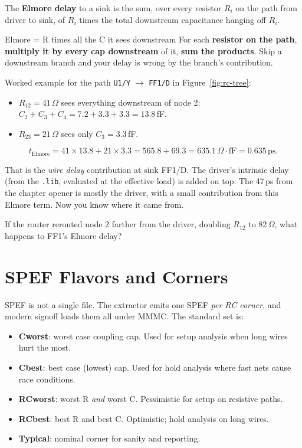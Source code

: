 The \textbf{Elmore delay} to a sink is the sum, over every resistor $R_i$ on the path from driver to sink, of $R_i$ times the total downstream capacitance hanging off $R_i$.

\begin{hook}{Elmore = R times all the C it sees downstream}
For each \textbf{resistor on the path}, \textbf{multiply it by every cap downstream} of it, \textbf{sum the products}. Skip a downstream branch and your delay is wrong by the branch's contribution.
\end{hook}

Worked example for the path \texttt{U1/Y} $\to$ \texttt{FF1/D} in Figure~\ref{fig:rc-tree}:

\begin{itemize}
  \item $R_{12} = 41\,\Omega$ sees everything downstream of node 2: $C_2 + C_3 + C_4 = 7.2 + 3.3 + 3.3 = 13.8$\,fF.
  \item $R_{23} = 21\,\Omega$ sees only $C_3 = 3.3$\,fF.
\end{itemize}

$$ t_{\text{Elmore}} = 41 \times 13.8 + 21 \times 3.3 = 565.8 + 69.3 = 635.1\,\Omega\cdot\text{fF} = 0.635\,\text{ps}.$$

That is the \emph{wire delay} contribution at sink FF1/D. The driver's intrinsic delay (from the \texttt{.lib}, evaluated at the effective load) is added on top. The 47\,ps from the chapter opener is mostly the driver, with a small contribution from this Elmore term. Now you know where it came from.

\begin{gut}
If the router rerouted node 2 farther from the driver, doubling $R_{12}$ to 82\,$\Omega$, what happens to FF1's Elmore delay? 
\end{gut}

\section{SPEF Flavors and Corners}

SPEF is not a single file. The extractor emits one SPEF \emph{per RC corner}, and modern signoff loads them all under MMMC. The standard set is:

\begin{itemize}
  \item \textbf{Cworst}: worst case coupling cap. Used for setup analysis when long wires hurt the most.
  \item \textbf{Cbest}: best case (lowest) cap. Used for hold analysis where fast nets cause race conditions.
  \item \textbf{RCworst}: worst R \emph{and} worst C. Pessimistic for setup on resistive paths.
  \item \textbf{RCbest}: best R and best C. Optimistic; hold analysis on long wires.
  \item \textbf{Typical}: nominal corner for sanity and reporting.
\end{itemize}

